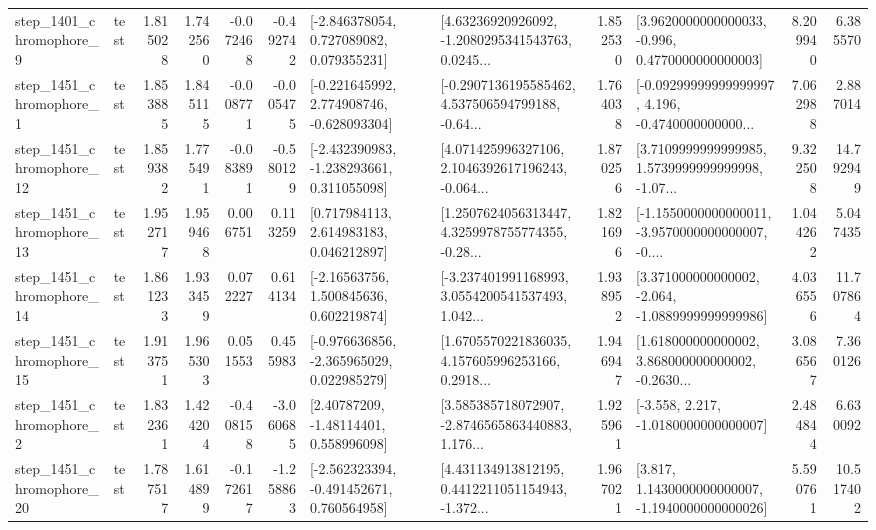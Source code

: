 \begin{tabular}{llrrrrllrlrr}
  step\_1401\_chromophore\_9 &      test &      1.815028 &    1.742560 &     -0.072468 & -0.492742 &    [-2.846378054, 0.727089082, 0.079355231] &  [4.63236920926092, -1.2080295341543763, 0.0245... &       1.852530 &   [3.9620000000000033, -0.996, 0.4770000000000003] &            8.209940 &          6.385570 \\
  step\_1451\_chromophore\_1 &      test &      1.853885 &    1.845115 &     -0.008771 & -0.005475 &   [-0.221645992, 2.774908746, -0.628093304] &  [-0.2907136195585462, 4.537506594799188, -0.64... &       1.764038 &  [-0.09299999999999997, 4.196, -0.4740000000000... &            7.062988 &          2.887014 \\
 step\_1451\_chromophore\_12 &      test &      1.859382 &    1.775491 &     -0.083891 & -0.580129 &   [-2.432390983, -1.238293661, 0.311055098] &  [4.071425996327106, 2.1046392617196243, -0.064... &       1.870256 &  [3.7109999999999985, 1.5739999999999998, -1.07... &            9.322508 &         14.792949 \\
 step\_1451\_chromophore\_13 &      test &      1.952717 &    1.959468 &      0.006751 &  0.113259 &     [0.717984113, 2.614983183, 0.046212897] &  [1.2507624056313447, 4.3259978755774355, -0.28... &       1.821696 &  [-1.1550000000000011, -3.9570000000000007, -0.... &            1.044262 &          5.047435 \\
 step\_1451\_chromophore\_14 &      test &      1.861233 &    1.933459 &      0.072227 &  0.614134 &     [-2.16563756, 1.500845636, 0.602219874] &  [-3.237401991168993, 3.0554200541537493, 1.042... &       1.938952 &   [3.371000000000002, -2.064, -1.0889999999999986] &            4.036556 &         11.707864 \\
 step\_1451\_chromophore\_15 &      test &      1.913751 &    1.965303 &      0.051553 &  0.455983 &   [-0.976636856, -2.365965029, 0.022985279] &  [1.6705570221836035, 4.157605996253166, 0.2918... &       1.946947 &  [1.618000000000002, 3.868000000000002, -0.2630... &            3.086567 &          7.360126 \\
  step\_1451\_chromophore\_2 &      test &      1.832361 &    1.424204 &     -0.408158 & -3.060685 &      [2.40787209, -1.48114401, 0.558996098] &  [3.585385718072907, -2.8746565863440883, 1.176... &       1.925961 &               [-3.558, 2.217, -1.0180000000000007] &            2.484844 &          6.630092 \\
 step\_1451\_chromophore\_20 &      test &      1.787517 &    1.614899 &     -0.172617 & -1.258863 &   [-2.562323394, -0.491452671, 0.760564958] &  [4.431134913812195, 0.4412211051154943, -1.372... &       1.967021 &   [3.817, 1.1430000000000007, -1.1940000000000026] &            5.590761 &         10.517402 \\

\end{tabular}
